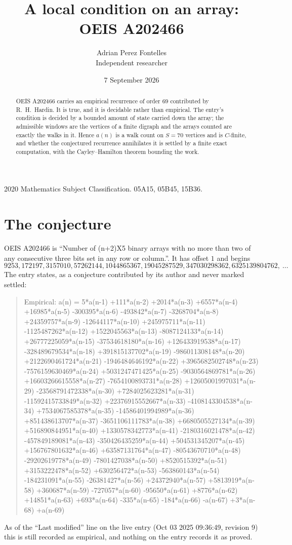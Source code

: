 \documentclass[11pt,a4paper]{article}
\title{A local condition on an array: OEIS A202466}
\author{Adrian Perez Fontelles\\ \small Independent researcher}
\date{7 September 2026}
\theoremstyle{plain}
\theoremstyle{definition}
\begin{document}
\maketitle

\begin{abstract}
OEIS A202466 carries an empirical recurrence of order $69$ contributed by R.~H.~Hardin. It is
true, and it is decidable rather than empirical. The entry's condition is decided by a bounded amount of state carried down the array; the
admissible windows are the vertices of a finite digraph and the arrays counted are exactly the
walks in it. Hence $a(n)$ is a walk count on $S=70$ vertices and is $C$-finite, and whether the
conjectured recurrence annihilates it is settled by a finite exact computation, with the
Cayley--Hamilton theorem bounding the work.
\end{abstract}

\noindent\small 2020 Mathematics Subject Classification. 05A15, 05B45, 15B36.\normalsize

\section{The conjecture}

OEIS A202466 is ``Number of (n+2)X5 binary arrays with no more than two of any consecutive three bits set in any row or column.''. It has offset $1$ and begins
\[
9253, 172197, 3157010, 57262144, 1044865367, 19045287529, 347030298362, 6325139804762,\ \dots
\]
The entry states, as a conjecture contributed by its author and never marked settled:
\begin{quote}
Empirical: a(n) = 5*a(n-1) +111*a(n-2) +2014*a(n-3) +6557*a(n-4) +16985*a(n-5) -300395*a(n-6) -493842*a(n-7) -3268704*a(n-8) +24359757*a(n-9) -12644117*a(n-10) +245975711*a(n-11) -1125487262*a(n-12) +1522045563*a(n-13) -8087124133*a(n-14) +26777225059*a(n-15) -37534618180*a(n-16) +126433919538*a(n-17) -328489679534*a(n-18) +391815137702*a(n-19) -986011308148*a(n-20) +2122690461724*a(n-21) -1946484646192*a(n-22) +3965682502748*a(n-23) -7576159630469*a(n-24) +5031247471425*a(n-25) -9030564869781*a(n-26) +16603266615558*a(n-27) -7654100893731*a(n-28) +12605001997031*a(n-29) -23568791472338*a(n-30) +7284025623281*a(n-31) -11592415733849*a(n-32) +22376915552667*a(n-33) -4108143304538*a(n-34) +7534067585378*a(n-35) -14586401994989*a(n-36) +851438613707*a(n-37) -3651106111783*a(n-38) +6680505527134*a(n-39) +516890844951*a(n-40) +1330578342773*a(n-41) -2180316021478*a(n-42) -457849189081*a(n-43) -350426435259*a(n-44) +504531345207*a(n-45) +156767801632*a(n-46) +63587131764*a(n-47) -80543670710*a(n-48) -29202619778*a(n-49) -7801427038*a(n-50) +8520515392*a(n-51) +3153222478*a(n-52) +630256472*a(n-53) -563860143*a(n-54) -184231091*a(n-55) -26381427*a(n-56) +24372940*a(n-57) +5813919*a(n-58) +360687*a(n-59) -727057*a(n-60) -95650*a(n-61) +8776*a(n-62) +14851*a(n-63) +693*a(n-64) -335*a(n-65) -184*a(n-66) -a(n-67) +3*a(n-68) +a(n-69)
\end{quote}
As of the ``Last modified'' line on the live entry (Oct 03 2025 09:36:49, revision 9) this is still
recorded as empirical, and nothing on the entry records it as proved.
\end{document}
